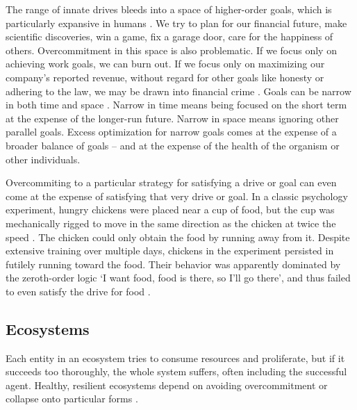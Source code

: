 \documentclass[12pt]{article}
\begin{document}
The range of innate drives bleeds into a space of higher-order goals, which is particularly expansive in humans \citep{maslow1943theory, miller1960plans, miller2001integrative, vallacher1987people, balleine2007role, cardinal2002emotion, frank2006anatomy, saunders2012role, o2014goal, schank1977scripts}. We try to plan for our financial future, make scientific discoveries, win a game, fix a garage door, care for the happiness of others. Overcommitment in this space is also problematic. If we focus only on achieving work goals, we can burn out. If we focus only on maximizing our company's reported revenue, without regard for other goals like honesty or adhering to the law, we may be drawn into financial crime \citep{campbell1979assessing, ordonez2009goals, kerr1975folly, burns2006impact}. Goals can be narrow in both time and space \citep{ballard2018pursuit, vallacher1987people, shah2002forgetting, evenden1999varieties}. Narrow in time means being focused on the short term at the expense of the longer-run future. Narrow in space means ignoring other parallel goals. Excess optimization for narrow goals comes at the expense of a broader balance of goals -- and at the expense of the health of the organism or other individuals.

Overcommiting to a particular strategy for satisfying a drive or goal can even come at the expense of satisfying that very drive or goal. In a classic psychology experiment, hungry chickens were placed near a cup of food, but the cup was mechanically rigged to move in the same direction as the chicken at twice the speed \citep{hershberger1986approach}. The chicken could only obtain the food by running away from it. Despite extensive training over multiple days, chickens in the experiment persisted in futilely running toward the food. Their behavior was apparently dominated by the zeroth-order logic `I want food, food is there, so I'll go there', and thus failed to even satisfy the drive for food \citep{dayan2006misbehavior, van2012information, o2017learning}.


\subsection{Ecosystems}

Each entity in an ecosystem tries to consume resources and proliferate, but if it succeeds too thoroughly, the whole system suffers, often including the successful agent. Healthy, resilient ecosystems depend on avoiding overcommitment or collapse onto particular forms \citep{holling1973resilience, yachi1999biodiversity}.
\end{document}
